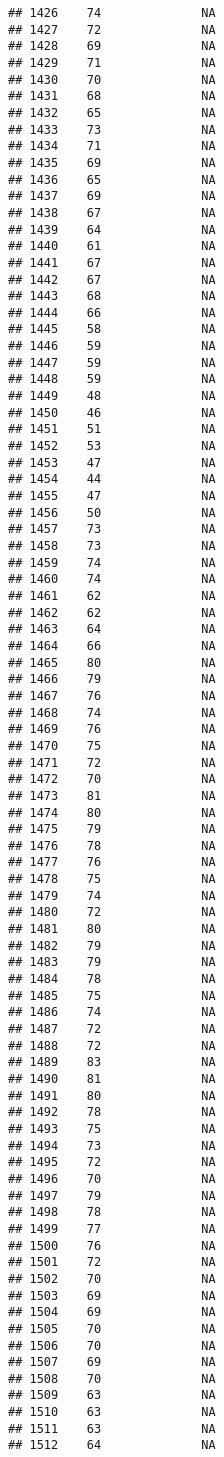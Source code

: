 \documentclass[]{article}
\begin{document}
\begin{verbatim}
## 1426    74              NA
## 1427    72              NA
## 1428    69              NA
## 1429    71              NA
## 1430    70              NA
## 1431    68              NA
## 1432    65              NA
## 1433    73              NA
## 1434    71              NA
## 1435    69              NA
## 1436    65              NA
## 1437    69              NA
## 1438    67              NA
## 1439    64              NA
## 1440    61              NA
## 1441    67              NA
## 1442    67              NA
## 1443    68              NA
## 1444    66              NA
## 1445    58              NA
## 1446    59              NA
## 1447    59              NA
## 1448    59              NA
## 1449    48              NA
## 1450    46              NA
## 1451    51              NA
## 1452    53              NA
## 1453    47              NA
## 1454    44              NA
## 1455    47              NA
## 1456    50              NA
## 1457    73              NA
## 1458    73              NA
## 1459    74              NA
## 1460    74              NA
## 1461    62              NA
## 1462    62              NA
## 1463    64              NA
## 1464    66              NA
## 1465    80              NA
## 1466    79              NA
## 1467    76              NA
## 1468    74              NA
## 1469    76              NA
## 1470    75              NA
## 1471    72              NA
## 1472    70              NA
## 1473    81              NA
## 1474    80              NA
## 1475    79              NA
## 1476    78              NA
## 1477    76              NA
## 1478    75              NA
## 1479    74              NA
## 1480    72              NA
## 1481    80              NA
## 1482    79              NA
## 1483    79              NA
## 1484    78              NA
## 1485    75              NA
## 1486    74              NA
## 1487    72              NA
## 1488    72              NA
## 1489    83              NA
## 1490    81              NA
## 1491    80              NA
## 1492    78              NA
## 1493    75              NA
## 1494    73              NA
## 1495    72              NA
## 1496    70              NA
## 1497    79              NA
## 1498    78              NA
## 1499    77              NA
## 1500    76              NA
## 1501    72              NA
## 1502    70              NA
## 1503    69              NA
## 1504    69              NA
## 1505    70              NA
## 1506    70              NA
## 1507    69              NA
## 1508    70              NA
## 1509    63              NA
## 1510    63              NA
## 1511    63              NA
## 1512    64              NA

\end{verbatim}
\end{document}
